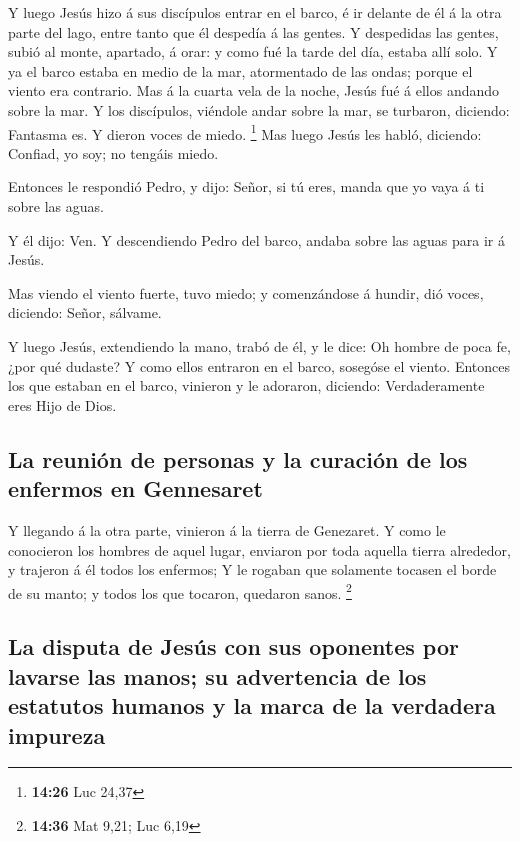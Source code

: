  Y luego Jesús hizo á sus discípulos entrar en el barco,
é ir delante de él á la otra parte del lago, entre tanto que él despedía
á las gentes.  Y despedidas las gentes, subió al monte,
apartado, á orar: y como fué la tarde del día, estaba allí solo.
 Y ya el barco estaba en medio de la mar, atormentado de
las ondas; porque el viento era contrario.  Mas á la
cuarta vela de la noche, Jesús fué á ellos andando sobre la mar.
 Y los discípulos, viéndole andar sobre la mar, se
turbaron, diciendo: Fantasma es. Y dieron voces de miedo. \footnote{\textbf{14:26}
  Luc 24,37}  Mas luego Jesús les habló, diciendo:
Confiad, yo soy; no tengáis miedo.

 Entonces le respondió Pedro, y dijo: Señor, si tú eres,
manda que yo vaya á ti sobre las aguas.

 Y él dijo: Ven. Y descendiendo Pedro del barco, andaba
sobre las aguas para ir á Jesús.

 Mas viendo el viento fuerte, tuvo miedo; y comenzándose
á hundir, dió voces, diciendo: Señor, sálvame.

 Y luego Jesús, extendiendo la mano, trabó de él, y le
dice: Oh hombre de poca fe, ¿por qué dudaste?  Y como
ellos entraron en el barco, sosegóse el viento.  Entonces
los que estaban en el barco, vinieron y le adoraron, diciendo:
Verdaderamente eres Hijo de Dios.

\hypertarget{la-reuniuxf3n-de-personas-y-la-curaciuxf3n-de-los-enfermos-en-gennesaret}{%
\subsection{La reunión de personas y la curación de los enfermos en
Gennesaret}\label{la-reuniuxf3n-de-personas-y-la-curaciuxf3n-de-los-enfermos-en-gennesaret}}

 Y llegando á la otra parte, vinieron á la tierra de
Genezaret.  Y como le conocieron los hombres de aquel
lugar, enviaron por toda aquella tierra alrededor, y trajeron á él todos
los enfermos;  Y le rogaban que solamente tocasen el
borde de su manto; y todos los que tocaron, quedaron sanos. \footnote{\textbf{14:36}
  Mat 9,21; Luc 6,19}

\hypertarget{la-disputa-de-jesuxfas-con-sus-oponentes-por-lavarse-las-manos-su-advertencia-de-los-estatutos-humanos-y-la-marca-de-la-verdadera-impureza}{%
\subsection{La disputa de Jesús con sus oponentes por lavarse las manos;
su advertencia de los estatutos humanos y la marca de la verdadera
impureza}\label{la-disputa-de-jesuxfas-con-sus-oponentes-por-lavarse-las-manos-su-advertencia-de-los-estatutos-humanos-y-la-marca-de-la-verdadera-impureza}}

